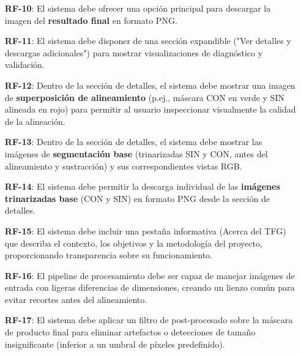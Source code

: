 \begin{itemize}
    \item[\textbf{RF-10}:] El sistema debe ofrecer una opción principal para descargar la imagen del \textbf{resultado final} en formato PNG.
    \item[\textbf{RF-11}:] El sistema debe disponer de una sección expandible ("Ver detalles y descargas adicionales") para mostrar visualizaciones de diagnóstico y validación.
    \item[\textbf{RF-12}:] Dentro de la sección de detalles, el sistema debe mostrar una imagen de \textbf{superposición de alineamiento} (p.ej., máscara CON en verde y SIN alineada en rojo) para permitir al usuario inspeccionar visualmente la calidad de la alineación.
    \item[\textbf{RF-13}:] Dentro de la sección de detalles, el sistema debe mostrar las imágenes de \textbf{segmentación base} (trinarizadas SIN y CON, antes del alineamiento y sustracción) y sus correspondientes vistas RGB.
    \item[\textbf{RF-14}:] El sistema debe permitir la descarga individual de las \textbf{imágenes trinarizadas base} (CON y SIN) en formato PNG desde la sección de detalles.
    \item[\textbf{RF-15}:] El sistema debe incluir una pestaña informativa (Acerca del TFG) que describa el contexto, los objetivos y la metodología del proyecto, proporcionando transparencia sobre su funcionamiento.
    \item[\textbf{RF-16}:] El pipeline de procesamiento debe ser capaz de manejar imágenes de entrada con ligeras diferencias de dimensiones, creando un lienzo común para evitar recortes antes del alineamiento.
    \item[\textbf{RF-17}:] El sistema debe aplicar un filtro de post-procesado sobre la máscara de producto final para eliminar artefactos o detecciones de tamaño insignificante (inferior a un umbral de píxeles predefinido).
\end{itemize}

